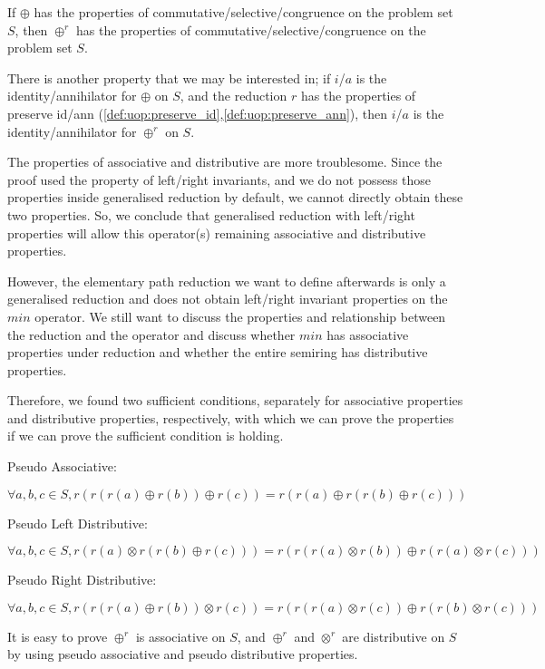 \documentclass[a4paper,12pt,twoside,openright]{report}
\newcommand{\e}[2]{
\begin{equation}
  \label{#1} 
  #2
\end{equation}
}
\begin{document}
If $\oplus$ has the properties of commutative/selective/congruence on the problem set $S$, then $\oplus^r$ has the properties of commutative/selective/congruence on the problem set $S$.

There is another property that we may be interested in; if $i$/$a$ is the identity/annihilator for $\oplus$ on $S$, and the reduction $r$ has the properties of preserve id/ann (\ref{def:uop:preserve_id},\ref{def:uop:preserve_ann}), then $i$/$a$ is the identity/annihilator for $\oplus^r$ on $S$.

The properties of associative and distributive are more troublesome. Since the proof used the property of left/right invariants, and we do not possess those properties inside generalised reduction by default, we cannot directly obtain these two properties. So, we conclude that generalised reduction with left/right properties will allow this operator(s) remaining associative and distributive properties.

However, the elementary path reduction we want to define afterwards is only a generalised reduction and does not obtain left/right invariant properties on the $min$ operator. We still want to discuss the properties and relationship between the reduction and the operator and discuss whether $min$ has associative properties under reduction and whether the entire semiring has distributive properties.

Therefore, we found two sufficient conditions, separately for associative properties and distributive properties, respectively, with which we can prove the properties if we can prove the sufficient condition is holding.

Pseudo Associative:
\e{gr:def:pseudo_associative}{\forall a,b,c \in S, r(r(r(a)\oplus r(b)) \oplus r(c)) = r(r(a) \oplus r(r(b)\oplus r(c)))}
Pseudo Left Distributive: 
\e{gr:def:pseudo_left_distributive}{\forall a,b,c \in S, r(r(a) \otimes r(r(b)\oplus r(c))) = r(r(r(a) \otimes r(b)) \oplus r(r(a) \otimes r(c)))}
Pseudo Right Distributive: 
\e{gr:def:pseudo_right_distributive}{\forall a,b,c \in S, r(r(r(a) \oplus r(b)) \otimes r(c)) = r(r(r(a) \otimes r(c)) \oplus r(r(b) \otimes r(c)))}
It is easy to prove $\oplus^r$ is associative on $S$, and $\oplus^r$ and $\otimes^r$ are distributive on $S$ by using pseudo associative and pseudo distributive properties.
\end{document}
